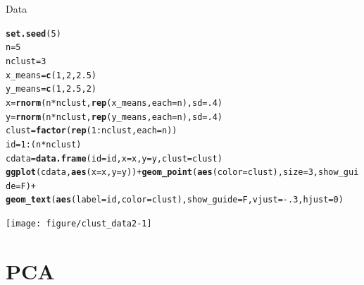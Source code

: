 \documentclass{beamer}\usepackage[]{graphicx}\usepackage[]{color}
\makeatletter
\newcommand{\hlnum}[1]{\textcolor[rgb]{0.686,0.059,0.569}{#1}}%
\newcommand{\hlopt}[1]{\textcolor[rgb]{0,0,0}{#1}}%
\newcommand{\hlstd}[1]{\textcolor[rgb]{0.345,0.345,0.345}{#1}}%
\newcommand{\hlkwb}[1]{\textcolor[rgb]{0.69,0.353,0.396}{#1}}%
\newcommand{\hlkwc}[1]{\textcolor[rgb]{0.333,0.667,0.333}{#1}}%
\newcommand{\hlkwd}[1]{\textcolor[rgb]{0.737,0.353,0.396}{\textbf{#1}}}%
\newenvironment{kframe}{%
 \def\at@end@of@kframe{}%
 \ifinner\ifhmode%
  \def\at@end@of@kframe{\end{minipage}}%
  \begin{minipage}{\columnwidth}%
 \fi\fi%
 \def\FrameCommand##1{\hskip\@totalleftmargin \hskip-\fboxsep
 \colorbox{shadecolor}{##1}\hskip-\fboxsep
     \hskip-\linewidth \hskip-\@totalleftmargin \hskip\columnwidth}%
 \MakeFramed {\advance\hsize-\width
   \@totalleftmargin\z@ \linewidth\hsize
   \@setminipage}}%
 {\par\unskip\endMakeFramed%
 \at@end@of@kframe}
\newenvironment{knitrout}{}{} %
\makeatother
\begin{document}
\begin{frame}[fragile]{Data}
\begin{knitrout}\tiny
{}\color{fgcolor}\begin{kframe}
\begin{alltt}
\hlkwd{set.seed}\hlstd{(}\hlnum{5}\hlstd{)}
\hlstd{n} \hlkwb{=} \hlnum{5}
\hlstd{nclust} \hlkwb{=} \hlnum{3}
\hlstd{x_means} \hlkwb{=} \hlkwd{c}\hlstd{(}\hlnum{1}\hlstd{,} \hlnum{2}\hlstd{,} \hlnum{2.5}\hlstd{)}
\hlstd{y_means} \hlkwb{=} \hlkwd{c}\hlstd{(}\hlnum{1}\hlstd{,} \hlnum{2.5}\hlstd{,} \hlnum{2}\hlstd{)}
\hlstd{x} \hlkwb{=} \hlkwd{rnorm}\hlstd{(n} \hlopt{*} \hlstd{nclust,} \hlkwd{rep}\hlstd{(x_means,} \hlkwc{each}\hlstd{=n),} \hlkwc{sd}\hlstd{=}\hlnum{.4}\hlstd{)}
\hlstd{y} \hlkwb{=} \hlkwd{rnorm}\hlstd{(n} \hlopt{*} \hlstd{nclust,} \hlkwd{rep}\hlstd{(y_means,} \hlkwc{each}\hlstd{=n),} \hlkwc{sd}\hlstd{=}\hlnum{.4}\hlstd{)}
\hlstd{clust} \hlkwb{=} \hlkwd{factor}\hlstd{(}\hlkwd{rep}\hlstd{(}\hlnum{1}\hlopt{:}\hlstd{nclust,} \hlkwc{each}\hlstd{=n))}
\hlstd{id} \hlkwb{=} \hlnum{1}\hlopt{:}\hlstd{(n} \hlopt{*} \hlstd{nclust)}
\hlstd{cdata} \hlkwb{=} \hlkwd{data.frame}\hlstd{(}\hlkwc{id}\hlstd{=id,} \hlkwc{x}\hlstd{=x,} \hlkwc{y}\hlstd{=y,} \hlkwc{clust}\hlstd{=clust)}
\hlkwd{ggplot}\hlstd{(cdata,} \hlkwd{aes}\hlstd{(}\hlkwc{x}\hlstd{=x,} \hlkwc{y}\hlstd{=y))} \hlopt{+} \hlkwd{geom_point}\hlstd{(}\hlkwd{aes}\hlstd{(}\hlkwc{color}\hlstd{=clust),} \hlkwc{size}\hlstd{=}\hlnum{3}\hlstd{,} \hlkwc{show_guide}\hlstd{=F)} \hlopt{+}
  \hlkwd{geom_text}\hlstd{(}\hlkwd{aes}\hlstd{(}\hlkwc{label}\hlstd{=id,} \hlkwc{color}\hlstd{=clust),} \hlkwc{show_guide}\hlstd{=F,} \hlkwc{vjust}\hlstd{=}\hlopt{-}\hlnum{.3}\hlstd{,} \hlkwc{hjust}\hlstd{=}\hlnum{0}\hlstd{)}
\end{alltt}
\end{kframe}

{\centering \texttt{[image: figure/clust\_data2-1]} 

}



\end{knitrout}
\end{frame}

\section{PCA}
\begin{frame}
\tableofcontents[currentsection]
\end{frame}
\end{document}
